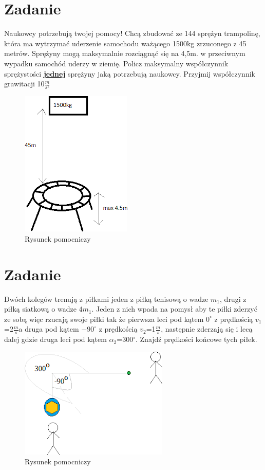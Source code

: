 \documentclass[14pt]{extarticle}
\begin{document}
    \section{Zadanie}
    \begin{flushleft}
        Naukowcy potrzebują twojej pomocy! Chcą zbudować ze 144 sprężyn trampolinę, która ma wytrzymać uderzenie samochodu ważącego 1500kg zrzuconego z 45 metrów.
        Sprężyny mogą maksymalnie rozciągnąć się na 4,5m. w przeciwnym wypadku samochód uderzy w ziemię.
        Policz maksymalny współczynnik sprężystości \textbf{\underline{jednej}} sprężyny jaką potrzebują naukowcy.
        Przyjmij współczynnik grawitacji 10$\frac{m}{s^2}$
    \end{flushleft}
    \begin{figure}[H]
        \centering
        \includegraphics{trampolina}
        \caption{Rysunek pomocniczy}
    \end{figure}
    \clearpage
    \section{Zadanie}
    \begin{flushleft}
        Dwóch kolegów trenują z piłkami jeden z piłką tenisową o wadze $m_1$, drugi z piłką siatkową o wadze $4m_1$. Jeden z nich wpada na pomysł aby te piłki zderzyć ze sobą więc rzucają swoje piłki tak że
        pierwsza leci pod kątem $0^\circ$ z prędkością $v_1$=2$\frac{m}{s}$a druga pod kątem $-90^\circ$ z prędkością $v_2$=1$\frac{m}{s}$,
        następnie zderzają się i lecą dalej gdzie druga leci pod kątem $\alpha _2$=300$^\circ$.
        Znajdź prędkości końcowe tych piłek.
    \end{flushleft}
    \begin{figure}[H]
        \centering
        \includegraphics{pilki2}
        \caption{Rysunek pomocniczy}
    \end{figure}
    \clearpage
\end{document}
